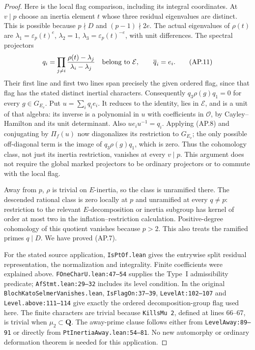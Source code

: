 \begin{proof}
Here is the local flag comparison, including its integral
coordinates.  At $v\mid p$ choose an inertia element $t$
whose three residual eigenvalues are distinct.  This is
possible because $p\nmid D$ and $(p-1)\nmid2e$.
The actual eigenvalues of $\rho(t)$ are
$\lambda_1=\varepsilon_p(t)^e$, $\lambda_2=1$,
$\lambda_3=\varepsilon_p(t)^{-e}$, with unit differences.
The spectral projectors
\[
 q_i=\prod_{j\ne i}
       \frac{\rho(t)-\lambda_j}{\lambda_i-\lambda_j}
       \quad\hbox{belong to }\mathcal E,
 \qquad\overline q_i=e_i.                                  \tag{AP.11}
\]
Their first line and first two lines span precisely the
given ordered flag, since that flag has the stated distinct
inertial characters.  Consequently
$q_3\rho(g)q_1=0$ for every $g\in G_{E_v}$.
Put $u=\sum_iq_ie_i$.  It reduces to the identity, lies in
$\mathcal E$, and is a unit of that algebra: its inverse
is a polynomial in $u$ with coefficients in $\mathcal O$,
by Cayley--Hamilton and its unit determinant.
Also $ue_iu^{-1}=q_i$.  Applying (AP.8) and conjugating by
$\Pi_f(u)$ now diagonalizes its restriction to $G_{E_v}$;
the only possible off-diagonal term is the image of
$q_3\rho(g)q_1$, which is zero.  Thus the cohomology class,
not just its inertia restriction, vanishes at every $v\mid p$.
This argument does not require the global marked projectors
to be ordinary projectors or to commute with the local flag.

Away from $p$, $\rho$ is trivial on $E$-inertia, so
the class is unramified there.  The descended rational
class is zero locally at $p$ and unramified at every
$q\ne p$: restriction to the relevant $E$-decomposition
or inertia subgroup has kernel of order at most two in
the inflation--restriction calculation.  Positive-degree
cohomology of this quotient vanishes because $p>2$.
This also treats the ramified primes $q\mid D$.
We have proved (AP.7).

For the stated source application, \texttt{IsPtOf.lean}
gives the entrywise split residual representation, the
normalization and integrality.  Finite coefficients were
explained above.  \texttt{FOneCharU.lean:47--54} supplies
the Type~I admissibility predicate; \texttt{AfStmt.lean:29--32}
includes its level condition.  In the original
\texttt{BlochKatoSelmerVanishes.lean},
\texttt{IsFlagOn:37--39}, \texttt{LevelAt:102--107} and
\texttt{Level.above:111--114} give exactly the ordered
decomposition-group flag used here.  The finite characters
are trivial because \texttt{KillsMu 2}, defined at lines
66--67, is trivial when $\mu_2\subset\mathbf Q$.
The away-prime clause follows either from
\texttt{LevelAway:89--91} or directly from
\texttt{PtInertiaAway.lean:54--81}.  No new automorphy or
ordinary deformation theorem is needed for this application.
\end{proof}

